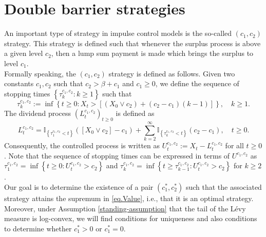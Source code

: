 \documentclass[10pt,a4paper]{amsart}
\newcommand{\Ind}{\mathbb{I}}
\newcommand{\BRA}[1]{{{\left\{#1\right\}}}} %
\renewcommand{\geq}{\geqslant}
\begin{document}
\section{Double barrier strategies}\label{Sec:Barrier}
An important type of strategy in impulse control models is the so-called $(c_1,c_2)$ strategy. This strategy is defined such that whenever the surplus process is above a given level $c_2$, then a lump sum payment is made which brings the surplus to level $c_1$.\\
Formally speaking, the $(c_1,c_2)$ strategy is defined as follows. Given two constants $c_1,c_2$ such that $c_2 > \beta + c_1$ and $c_1 \geq 0$, we define the sequence of stopping times $\BRA{\tau^{c_1,c_2}_k : k \geq 1}$ such that
\[
\tau^{c_1,c_2}_k := \inf \BRA{t\geq 0: X_t > [(X_0 \vee c_2) + (c_2 - c_1)(k-1)]}, \quad k \geq 1.
\]
The dividend process $(L^{c_1,c_2}_t)_{t\geq 0}$ is defined as
\[
L^{c_1,c_2}_t =\Ind_{\BRA{\tau^{c_1,c_2}_1 < t}}([X_0 \vee c_2] - c_1) + \sum_{k=2}^{\infty}\Ind_{\BRA{\tau^{c_1,c_2}_k<t}}(c_2-c_1), \quad t\geq 0.
\]
Consequently, the controlled process is written as $U^{c_1,c_2}_t := X_t - L^{c_1,c_2}_t$ for all $t \geq 0$. Note that the sequence of stopping times can be expressed in terms of $U^{c_1,c_2}$ as $\tau^{c_1,c_2}_1 = \inf\BRA{t\geq 0: U^{c_1,c_2}_t > c_2}$ and $\tau^{c_1,c_2}_k = \inf\BRA{t \geq \tau^{c_1,c_2}_{k-1}: U^{c_1,c_2}_t > c_2 }$ for $k \geq 2$.\\
Our goal is to determine the existence of a pair $(c_1^\ast,c_2^\ast)$ such that the associated strategy attains the supremum in \eqref{eq.Value}, i.e., that it is an optimal strategy. Moreover, under Assumption \ref{standing-assumption} that the tail of the L\'evy measure is log-convex, we will find conditions for uniqueness and also conditions to determine whether $c_1^\ast > 0$ or $c_1^\ast = 0$.
\end{document}
